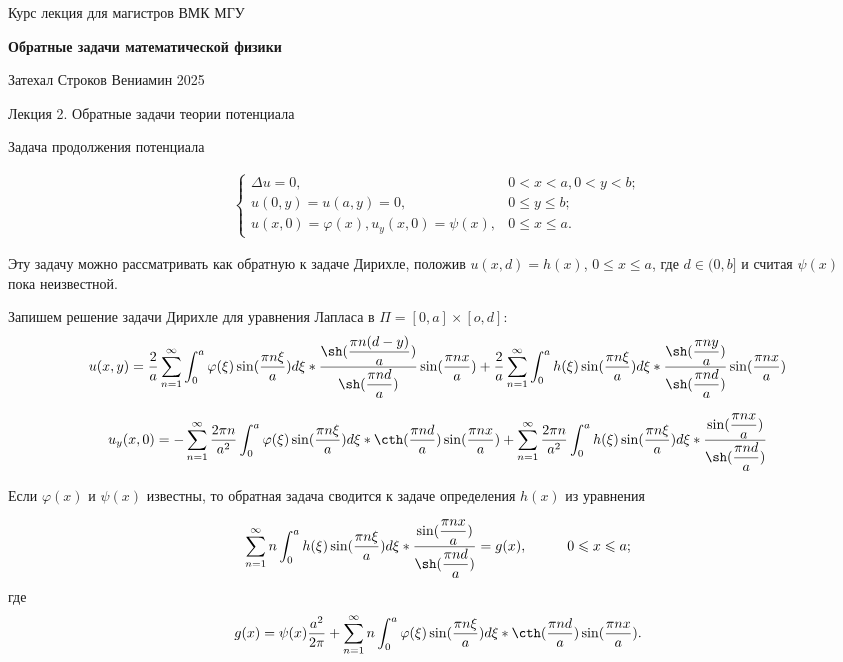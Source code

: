 \documentclass{article}
\begin{document}
\centerline{\large Курс лекция для магистров ВМК МГУ}
\centerline {\textbf{\LARGE Обратные задачи математической физики}}
\centerline {Затехал Строков Вениамин 2025}

\vspace{0.4cm}

\centerline{\LARGE Лекция 2. Обратные задачи теории потенциала}

\vspace{0.5cm}

\centerline{\large Задача продолжения потенциала}

\begin{align}
\begin{cases}
\Delta u = 0, & 0 < x < a, 0 < y < b;\\
u(0,y) = u(a,y) = 0, & 0 \leqslant y \leqslant b;\\
u(x,0) = \varphi(x), u_y(x,0) = \psi(x), & 0 \leqslant x \leqslant a.
\end{cases}
\end{align}

Эту задачу можно рассматривать как обратную к задаче Дирихле, положив $u(x,d) = h(x)$, $0 \leqslant x \leqslant a$, где $d \in (0,b]$ и считая $\psi(x)$ пока неизвестной. 

Запишем решение задачи Дирихле для уравнения Лапласа в $\Pi = [0,a] \times [o,d]$:
\[
u(x,y) = 
\dfrac{2}{a} \sum_{n=1}^{\infty} \int_0^a \varphi(\xi) \sin(\dfrac{ \pi n \xi }{a}) d \xi *
\dfrac{\sh (\dfrac{\pi n (d-y)}{a})}{\sh( \dfrac{\pi n d}{a})} \sin (\dfrac{\pi n x}{a}) +
\dfrac{2}{a} \sum_{n=1}^{\infty} \int_0^a h(\xi) \sin(\dfrac{ \pi n \xi }{a}) d \xi *
\dfrac{\sh (\dfrac{\pi n y}{a})}{\sh (\dfrac{\pi n d}{a})} \sin( \dfrac{\pi n x}{a})
\]

\[ %
u_y(x,0) = 
- \sum_{n=1}^{\infty} \dfrac{2 \pi n}{a^2} \int_0^a \varphi(\xi) \sin(\dfrac{ \pi n \xi }{a}) d \xi*
\cth( \dfrac{\pi n d}{a} )\sin( \dfrac{\pi n x}{a} )+
\sum_{n=1}^{\infty} \dfrac{2 \pi n}{a^2} \int_0^a h(\xi) \sin(\dfrac{ \pi n \xi }{a}) d \xi *
\dfrac{\sin( \dfrac{\pi n x}{a})}{\sh (\dfrac{\pi n d}{a})} 
\]

Если $\varphi(x)$ и $\psi(x)$ известны, то обратная задача сводится к задаче определения $h(x)$ из уравнения

\[
\sum_{n=1}^{\infty} n \int_0^a h(\xi) \sin(\dfrac{ \pi n \xi }{a}) d \xi *
\dfrac{\sin( \dfrac{\pi n x}{a})}{\sh (\dfrac{\pi n d}{a})} = g(x), \hspace{1cm} 0 \leqslant x \leqslant a;
\]
где 
\[
g(x) = \psi(x) \frac{a^2}{2 \pi} + \sum_{n=1}^{\infty} n \int_0^a  \varphi(\xi) \sin(\dfrac{ \pi n \xi }{a}) d \xi* \cth (\dfrac{\pi n d}{a}) \sin (\dfrac{\pi n x}{a}).
\]
\end{document}
